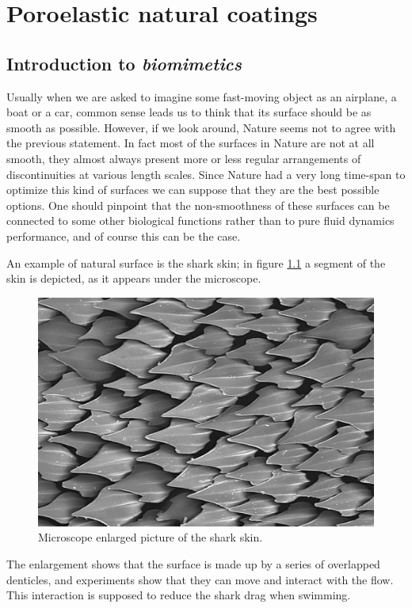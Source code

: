 \chapter{Poroelastic natural coatings}



\section{Introduction to \textit{biomimetics}}

Usually when we are asked to imagine some fast-moving object as an airplane, a boat or a car, common sense leads us to think that its surface should be as smooth as possible.
However, if we look around, Nature seems not to agree with the previous statement.
In fact most of the surfaces in Nature are not at all smooth, they almost always present more or less regular arrangements of discontinuities at various length scales.
Since Nature had a very long time-span to optimize this kind of surfaces we can suppose that they are the best possible options.
One should pinpoint that the non-smoothness of these surfaces can be connected to some other biological functions rather than to pure fluid dynamics performance, and of course this can be the case.

An example of natural surface is the shark skin; in figure \ref{fig:shark} a segment of the skin is depicted, as it appears under the microscope.

\begin{figure}[h]
	\centering
	\includegraphics[width=0.6\linewidth]{chapter_1/shark}
	\caption{Microscope enlarged picture of the shark skin.}
	\label{fig:shark}
\end{figure}

The enlargement shows that the surface is made up by a series of overlapped denticles, and experiments show that they can move and interact with the flow. This interaction is supposed to reduce the shark drag when swimming.

